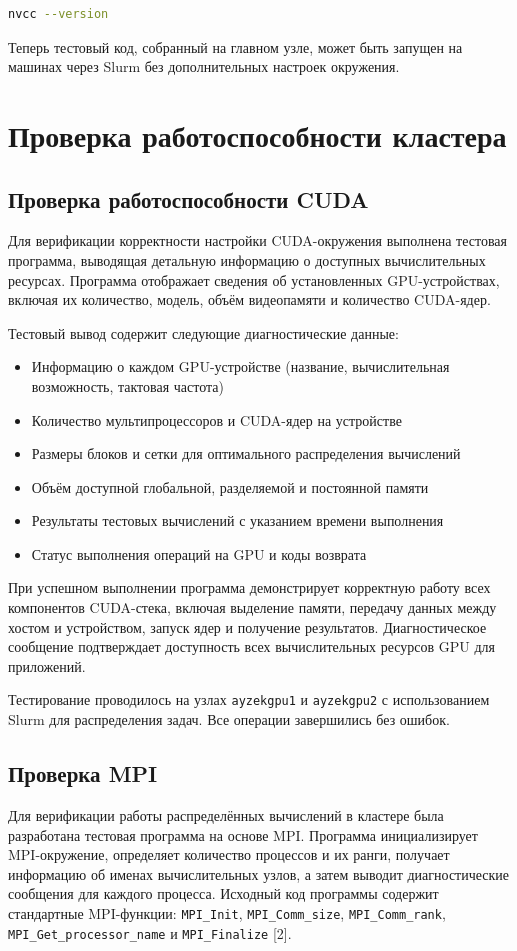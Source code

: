 \documentclass[areaset=advanced]{scrartcl}
\begin{document}
\begin{lstlisting}[language=bash]
nvcc --version
\end{lstlisting}

Теперь тестовый код, собранный на главном узле, может быть запущен на машинах через Slurm без дополнительных настроек окружения.

\newpage
\section{Проверка работоспособности кластера}
\subsection{Проверка работоспособности CUDA}
Для верификации корректности настройки CUDA-окружения выполнена тестовая программа, выводящая детальную информацию о доступных вычислительных ресурсах. Программа отображает сведения об установленных GPU-устройствах, включая их количество, модель, объём видеопамяти и количество CUDA-ядер.

Тестовый вывод содержит следующие диагностические данные:
\begin{itemize}
    \item Информацию о каждом GPU-устройстве (название, вычислительная возможность, тактовая частота)
    \item Количество мультипроцессоров и CUDA-ядер на устройстве
    \item Размеры блоков и сетки для оптимального распределения вычислений
    \item Объём доступной глобальной, разделяемой и постоянной памяти
    \item Результаты тестовых вычислений с указанием времени выполнения
    \item Статус выполнения операций на GPU и коды возврата
\end{itemize}

При успешном выполнении программа демонстрирует корректную работу всех компонентов CUDA-стека, включая выделение памяти, передачу данных между хостом и устройством, запуск ядер и получение результатов. Диагностическое сообщение подтверждает доступность всех вычислительных ресурсов GPU для приложений.

Тестирование проводилось на узлах \texttt{ayzekgpu1} и \texttt{ayzekgpu2} с использованием Slurm для распределения задач. Все операции завершились без ошибок.

\subsection{Проверка MPI}
Для верификации работы распределённых вычислений в кластере была разработана тестовая программа на основе MPI. Программа инициализирует MPI-окружение, определяет количество процессов и их ранги, получает информацию об именах вычислительных узлов, а затем выводит диагностические сообщения для каждого процесса. Исходный код программы содержит стандартные MPI-функции: \texttt{MPI\_Init}, \texttt{MPI\_Comm\_size}, \texttt{MPI\_Comm\_rank}, \texttt{MPI\_Get\_processor\_name} и \texttt{MPI\_Finalize} [2].
\end{document}
